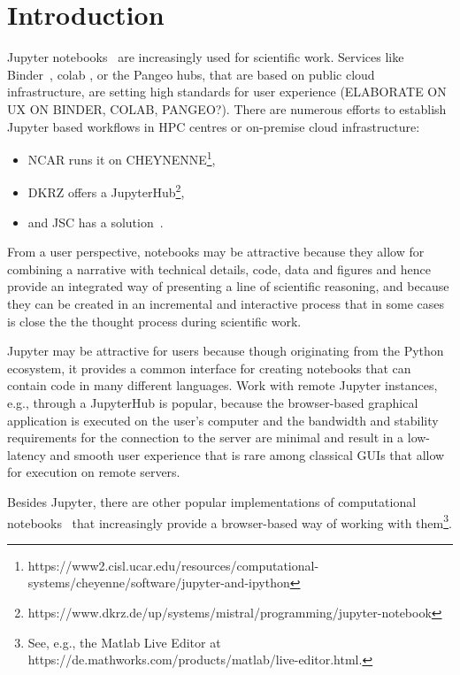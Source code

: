 
\section{Introduction}
\label{s-introductoin}

Jupyter notebooks~\citep{Kluyver2016} are increasingly used for scientific work.
Services like Binder~\citep{Jupyter2018}, colab \citep{Google2020, Carneiro2018}, or the Pangeo hubs\citep{robinson2019science}, that are based on public cloud infrastructure, are setting high standards for user experience (ELABORATE ON UX ON BINDER, COLAB, PANGEO?).
There are numerous efforts to establish Jupyter based workflows in HPC centres or on-premise cloud infrastructure:
\begin{itemize}
  \item NCAR runs it on CHEYNENNE\footnote{https://www2.cisl.ucar.edu/resources/computational-systems/cheyenne/software/jupyter-and-ipython},
  \item DKRZ offers a JupyterHub\footnote{https://www.dkrz.de/up/systems/mistral/programming/jupyter-notebook},
  \item and JSC has a solution~\citep{Goebbert2018}.
\end{itemize}

From a user perspective, notebooks may be attractive because they allow for combining a narrative with technical details, code, data and figures and hence provide an integrated way of presenting a line of scientific reasoning, and because they can be created in an incremental and interactive process that in some cases is close the the thought process during scientific work.

Jupyter may be attractive for users because though originating from the Python ecosystem, it provides a common interface for creating notebooks that can contain code in many different languages.
Work with remote Jupyter instances, e.g., through a JupyterHub is popular, because the browser-based graphical application is executed on the user's computer and the bandwidth and stability requirements for the connection to the server are minimal and result in a low-latency and smooth user experience that is rare among classical GUIs that allow for execution on remote servers.

Besides Jupyter, there are other popular implementations of computational notebooks~\citep{Hinsen2019a} that increasingly provide a browser-based way of working with them\footnote{See, e.g., the Matlab Live Editor at https://de.mathworks.com/products/matlab/live-editor.html.}.


